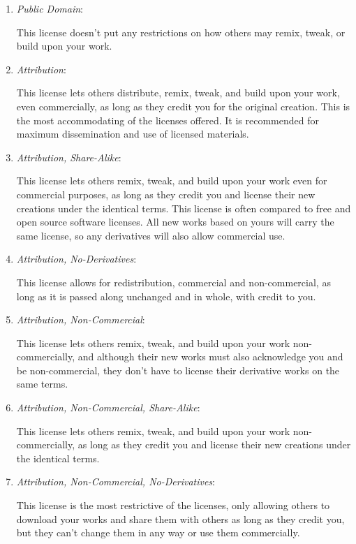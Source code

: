 \documentclass[botnum,fleqn,final]{unmeethesis}
\begin{document}
\begin{enumerate}
  \item \emph{Public Domain}:

  This license doesn't put any restrictions on how others may remix, tweak, or
  build upon your work.

  \item \emph{Attribution}:

  This license lets others distribute, remix, tweak, and build upon your work,
  even commercially, as long as they credit you for the original creation. This
  is the most accommodating of the licenses offered.  It is recommended for
  maximum dissemination and use of licensed materials.

  \item \emph{Attribution, Share-Alike}:

  This license lets others remix, tweak, and build upon your work even for
  commercial purposes, as long as they credit you and license their new
  creations under the identical terms.  This license is often compared to free
  and open source software licenses.  All new works based on yours will carry
  the same license, so any derivatives will also allow commercial use.

  \item \emph{Attribution, No-Derivatives}:

  This license allows for redistribution, commercial and non-commercial, as
  long as it is passed along unchanged and in whole, with credit to you.

  \item \emph{Attribution, Non-Commercial}:

  This license lets others remix, tweak, and build upon your work
  non-commercially, and although their new works must also acknowledge you and be
  non-commercial, they don't have to license their derivative works on the same
  terms.

  \item \emph{Attribution, Non-Commercial, Share-Alike}:

  This license lets others remix, tweak, and build upon your work
  non-commercially, as long as they credit you and license their new creations
  under the identical terms.

  \item \emph{Attribution, Non-Commercial, No-Derivatives}:

  This license is the most restrictive of the licenses, only allowing others to
  download your works and share them with others as long as they credit you, but
  they can't change them in any way or use them commercially.
\end{enumerate}
\end{document}
